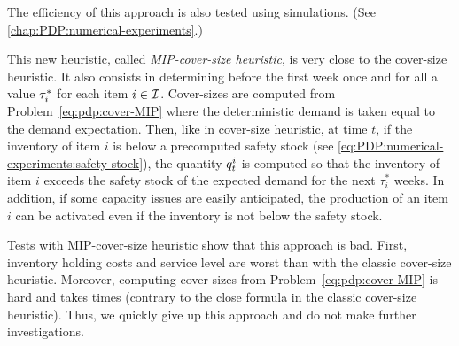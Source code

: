 The efficiency of this approach is also tested using simulations. (See \cref{chap:PDP:numerical-experiments}.)


This new heuristic, called \emph{MIP-cover-size heuristic}, is very close to the cover-size heuristic.
It also consists in determining before the first week once and for all a value $\tau_i^*$ for each item $i\in\mathcal{I}$.
Cover-sizes are computed from Problem~\eqref{eq:pdp:cover-MIP} where the deterministic demand is taken equal to the demand expectation.
Then, like in cover-size heuristic, at time $t$, if the inventory of item $i$ is below a precomputed safety stock (see \cref{eq:PDP:numerical-experiments:safety-stock}), the quantity $q_t^i$ is computed so that the inventory of item $i$ exceeds the safety stock of the expected demand for the next $\tau_i^*$ weeks.
In addition, if some capacity issues are easily anticipated, the production of an item $i$ can be activated even if the inventory is not below the safety stock.


Tests with MIP-cover-size heuristic show that this approach is bad.
First, inventory holding costs and service level are worst than with the classic cover-size heuristic.
Moreover, computing cover-sizes from Problem~\eqref{eq:pdp:cover-MIP} is hard and takes times (contrary to the close formula in the classic cover-size heuristic).
Thus, we quickly give up this approach and do not make further investigations.

